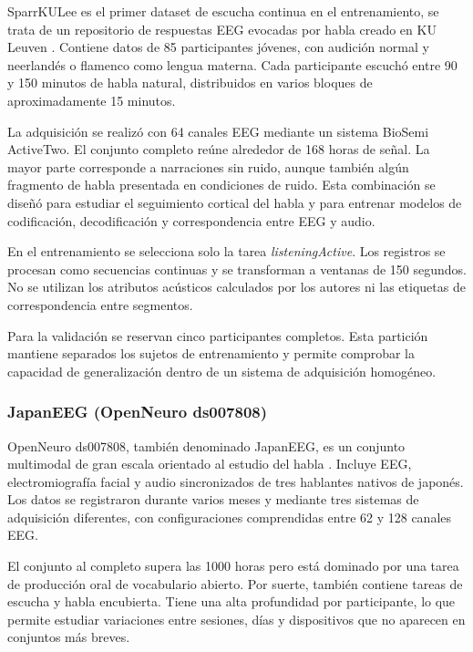 SparrKULee es el primer dataset de escucha continua en el entrenamiento, se trata de un repositorio de respuestas EEG evocadas por habla creado en KU Leuven \cite{accou2024sparrkulee}. Contiene datos de 85 participantes jóvenes, con audición normal y neerlandés o flamenco como lengua materna. Cada participante escuchó entre 90 y 150 minutos de habla natural, distribuidos en varios bloques de aproximadamente 15 minutos.

La adquisición se realizó con 64 canales EEG mediante un sistema BioSemi ActiveTwo. El conjunto completo reúne alrededor de 168 horas de señal. La mayor parte corresponde a narraciones sin ruido, aunque también algún fragmento de habla presentada en condiciones de ruido. Esta combinación se diseñó para estudiar el seguimiento cortical del habla y para entrenar modelos de codificación, decodificación y correspondencia entre EEG y audio.

En el entrenamiento se selecciona solo la tarea \textit{listeningActive}. Los registros se procesan como secuencias continuas y se transforman a ventanas de 150 segundos. No se utilizan los atributos acústicos calculados por los autores ni las etiquetas de correspondencia entre segmentos.

Para la validación se reservan cinco participantes completos. Esta partición mantiene separados los sujetos de entrenamiento y permite comprobar la capacidad de generalización dentro de un sistema de adquisición homogéneo.

\subsubsection{JapanEEG (OpenNeuro ds007808)}

OpenNeuro ds007808, también denominado JapanEEG, es un conjunto multimodal de gran escala orientado al estudio del habla \cite{sato2026japaneeg}. Incluye EEG, electromiografía facial y audio sincronizados de tres hablantes nativos de japonés. Los datos se registraron durante varios meses y mediante tres sistemas de adquisición diferentes, con configuraciones comprendidas entre 62 y 128 canales EEG.

El conjunto al completo supera las 1000 horas pero está dominado por una tarea de producción oral de vocabulario abierto. Por suerte, también contiene tareas de escucha y habla encubierta. Tiene una alta profundidad por participante, lo que permite estudiar variaciones entre sesiones, días y dispositivos que no aparecen en conjuntos más breves.

